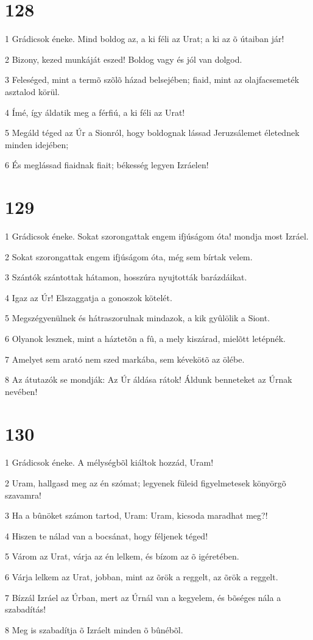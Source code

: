 \chapter{128}

\par 1 Grádicsok éneke. Mind boldog az, a ki féli az Urat; a ki az õ útaiban jár!
\par 2 Bizony, kezed munkáját eszed! Boldog vagy és jól van dolgod.
\par 3 Feleséged, mint a termõ szõlõ házad belsejében; fiaid, mint az olajfacsemeték asztalod körül.
\par 4 Ímé, így áldatik meg a férfiú, a ki féli az Urat!
\par 5 Megáld téged az Úr a Sionról, hogy boldognak lássad Jeruzsálemet életednek minden idejében;
\par 6 És meglássad fiaidnak fiait; békesség legyen Izráelen!

\chapter{129}

\par 1 Grádicsok éneke. Sokat szorongattak engem ifjúságom óta! mondja most Izráel.
\par 2 Sokat szorongattak engem ifjúságom óta, még sem bírtak velem.
\par 3 Szántók szántottak hátamon, hosszúra nyujtották barázdáikat.
\par 4 Igaz az Úr! Elszaggatja a gonoszok kötelét.
\par 5 Megszégyenülnek és hátraszorulnak mindazok, a kik gyûlölik a Siont.
\par 6 Olyanok lesznek, mint a háztetõn a fû, a mely kiszárad, mielõtt letépnék.
\par 7 Amelyet sem arató nem szed markába, sem kévekötõ az ölébe.
\par 8 Az átutazók se mondják: Az Úr áldása rátok! Áldunk benneteket az Úrnak nevében!

\chapter{130}

\par 1 Grádicsok éneke. A mélységbõl kiáltok hozzád, Uram!
\par 2 Uram, hallgasd meg az én szómat; legyenek füleid figyelmetesek könyörgõ szavamra!
\par 3 Ha a bûnöket számon tartod, Uram: Uram, kicsoda maradhat meg?!
\par 4 Hiszen te nálad van a bocsánat, hogy féljenek téged!
\par 5 Várom az Urat, várja az én lelkem, és bízom az õ igéretében.
\par 6 Várja lelkem az Urat, jobban, mint az õrök a reggelt, az õrök a reggelt.
\par 7 Bízzál Izráel az Úrban, mert az Úrnál van a kegyelem, és bõséges nála a szabadítás!
\par 8 Meg is szabadítja õ Izráelt minden õ bûnébõl.

